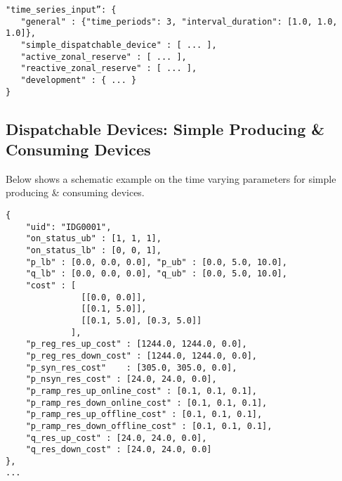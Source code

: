 \begin{verbatim}
"time_series_input”: {
   "general" : {"time_periods": 3, "interval_duration": [1.0, 1.0, 1.0]},
   "simple_dispatchable_device" : [ ... ],
   "active_zonal_reserve" : [ ... ],
   "reactive_zonal_reserve" : [ ... ],
   "development" : { ... }
}
\end{verbatim}



\subsection{Dispatchable Devices: Simple Producing \& Consuming Devices}
\label{sec:generator_time}
Below shows a schematic example on the time varying parameters for simple producing \& consuming devices.
\begin{verbatim}
{
    "uid": "IDG0001",
    "on_status_ub" : [1, 1, 1],
    "on_status_lb" : [0, 0, 1],
    "p_lb" : [0.0, 0.0, 0.0], "p_ub" : [0.0, 5.0, 10.0],
    "q_lb" : [0.0, 0.0, 0.0], "q_ub" : [0.0, 5.0, 10.0],
    "cost" : [
               [[0.0, 0.0]],
               [[0.1, 5.0]],
               [[0.1, 5.0], [0.3, 5.0]]
             ],
    "p_reg_res_up_cost" : [1244.0, 1244.0, 0.0], 
    "p_reg_res_down_cost" : [1244.0, 1244.0, 0.0],
    "p_syn_res_cost"    : [305.0, 305.0, 0.0], 
    "p_nsyn_res_cost" : [24.0, 24.0, 0.0], 
    "p_ramp_res_up_online_cost" : [0.1, 0.1, 0.1], 
    "p_ramp_res_down_online_cost" : [0.1, 0.1, 0.1],
    "p_ramp_res_up_offline_cost" : [0.1, 0.1, 0.1], 
    "p_ramp_res_down_offline_cost" : [0.1, 0.1, 0.1],
    "q_res_up_cost" : [24.0, 24.0, 0.0], 
    "q_res_down_cost" : [24.0, 24.0, 0.0]
},
...
\end{verbatim}

